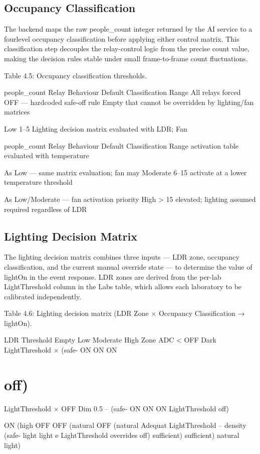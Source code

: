 \subsection{Occupancy Classification}


The backend maps the raw people_count integer returned by the AI service to a fourlevel occupancy classification before applying either control matrix. This classification
step decouples the relay-control logic from the precise count value, making the decision
rules stable under small frame-to-frame count fluctuations.

Table 4.5: Occupancy classification thresholds.

people_count Relay Behaviour Default
Classification Range
All relays forced OFF --- hardcoded safe-off rule
Empty that cannot be overridden by lighting/fan
matrices

Low 1--5 Lighting decision matrix evaluated with LDR; Fan


people_count Relay Behaviour Default
Classification Range
activation table evaluated with temperature

As Low --- same matrix evaluation; fan may
Moderate 6--15
activate at a lower temperature threshold

As Low/Moderate --- fan activation priority
High > 15 elevated; lighting assumed required regardless of
LDR


\subsection{Lighting Decision Matrix}


The lighting decision matrix combines three inputs --- LDR zone, occupancy
classification, and the current manual override state --- to determine the value of lightOn
in the event response. LDR zones are derived from the per-lab LightThreshold column in
the Labs table, which allows each laboratory to be calibrated independently.

Table 4.6: Lighting decision matrix (LDR Zone × Occupancy Classification → lightOn).

LDR Threshold Empty Low Moderate High
Zone
ADC < OFF
Dark LightThreshold × (safe- ON ON ON
\section{off)}


LightThreshold × OFF
Dim 0.5 -- (safe- ON ON ON
LightThreshold off)

ON (high
OFF OFF (natural OFF (natural
Adequat LightThreshold -- density
(safe- light light
e LightThreshold overrides
off) sufficient) sufficient)
natural light)




